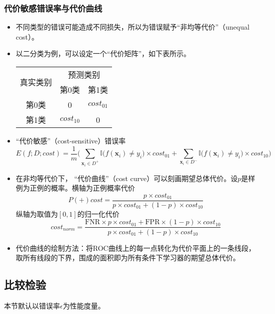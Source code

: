 \documentclass{ctexart}
\begin{document}
					\subsubsection{代价敏感错误率与代价曲线}
						\begin{itemize}
							\item 不同类型的错误可能造成不同损失，所以为错误赋予``非均等代价''（unequal cost）。
							\item 以二分类为例，可以设定一个``代价矩阵''，如下表所示。\begin{center}
								\begin{tabular}{|c|c|c|}
									\hline
									\multirow{2}{*}{真实类别} & \multicolumn{2}{c|}{预测类别} \\ \cline{2-3} 
									& 第0类         & 第1类         \\ \hline
									第0类                   & 0           & $cost_{01}$ \\ \hline
									第1类                   & $cost_{10}$ & 0           \\ \hline
								\end{tabular}	
							\end{center}
							\item ``代价敏感''（cost-sensitive）错误率\[E(f;D;cost)=\frac{1}{m}\bigg(\sum_{\bm{x}_i\in D^+}^{}\mathbb{I}\big(f(\bm{x}_i)\neq y_i\big)\times cost_{01}+\sum_{\bm{x}_i\in D^-}^{}\mathbb{I}\big(f(\bm{x}_i)\neq y_i\big)\times cost_{10}\bigg)\]
							\item 在非均等代价下， ``代价曲线''（cost curve）可以刻画期望总体代价。设$p$是样例为正例的概率。横轴为正例概率代价\[P(+)cost = \frac{p\times cost_{01}}{p\times cost_{01}+(1-p)\times cost_{10}}\]纵轴为取值为$[0,1]$的归一化代价\[cost_{norm}=\frac{\mathrm{FNR}\times p\times cost_{01}+\mathrm{FPR}\times(1-p)\times cost_{10}}{p\times cost_{01}+(1-p)\times cost_{10}}\]
							\item 代价曲线的绘制方法：将ROC曲线上的每一点转化为代价平面上的一条线段，取所有线段的下界，围成的面积即为所有条件下学习器的期望总体代价。
						\end{itemize}
				\subsection{比较检验}
					
					本节默认以错误率$\epsilon$为性能度量。
\end{document}
